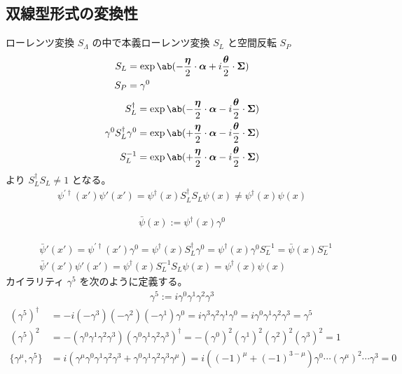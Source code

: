 \documentclass[uplatex,dvipdfmx,a4paper,11pt]{jlreq}
\theoremstyle{definition}
\numberwithin{equation}{section}
\begin{document}
\subsection{双線型形式の変換性}
ローレンツ変換 $S_\Lambda$ の中で本義ローレンツ変換 $S_L$ と空間反転 $S_P$
\begin{align}
  S_L & = \exp\ab(-\frac{\bm{\eta}}{2}\cdot\bm{\alpha} + i\frac{\bm{\theta}}{2}\cdot\bm{\Sigma}) \\
  S_P & = \gamma^0
\end{align}
\begin{align}
  S_L^\dagger                 & = \exp\ab(-\frac{\bm{\eta}}{2}\cdot\bm{\alpha} - i\frac{\bm{\theta}}{2}\cdot\bm{\Sigma}) \\
  \gamma^0S_L^\dagger\gamma^0 & = \exp\ab(+\frac{\bm{\eta}}{2}\cdot\bm{\alpha} - i\frac{\bm{\theta}}{2}\cdot\bm{\Sigma}) \\
  S_L^{-1}                    & = \exp\ab(+\frac{\bm{\eta}}{2}\cdot\bm{\alpha} - i\frac{\bm{\theta}}{2}\cdot\bm{\Sigma})
\end{align}
より $S_L^\dagger S_L \neq 1$ となる。
\begin{align}
  \psi^{\prime\dagger}(x')\psi'(x') = \psi^\dagger(x)S_L^\dagger S_L\psi(x) \neq \psi^\dagger(x)\psi(x)
\end{align}
\begin{definition}
  \begin{align}
    \bar{\psi}(x) := \psi^\dagger(x)\gamma^0
  \end{align}
\end{definition}
\begin{align}
   & \bar{\psi}'(x') = \psi^{\prime\dagger}(x')\gamma^0 = \psi^\dagger(x)S_L^\dagger\gamma^0 = \psi^\dagger(x)\gamma^0S_L^{-1} = \bar{\psi}(x)S_L^{-1} \\
   & \bar{\psi}'(x')\psi'(x') = \psi^\dagger(x)S_L^{-1} S_L\psi(x) = \psi^\dagger(x)\psi(x)
\end{align}
カイラリティ $\gamma^5$ を次のように定義する。
\begin{align}
  \gamma^5 := i\gamma^0\gamma^1\gamma^2\gamma^3
\end{align}
\begin{align}
  (\gamma^5)^\dagger                 & = -i(-\gamma^3)(-\gamma^2)(-\gamma^1)\gamma^0 = i\gamma^3\gamma^2\gamma^1\gamma^0 = i\gamma^0\gamma^1\gamma^2\gamma^3 = \gamma^5                                        \\
  (\gamma^5)^2                       & = -(\gamma^0\gamma^1\gamma^2\gamma^3)(\gamma^0\gamma^1\gamma^2\gamma^3)^\dagger = - (\gamma^0)^2(\gamma^1)^2(\gamma^2)^2(\gamma^3)^2 = 1                                \\
  \lbrace\gamma^\mu, \gamma^5\rbrace & = i(\gamma^\mu\gamma^0\gamma^1\gamma^2\gamma^3 + \gamma^0\gamma^1\gamma^2\gamma^3\gamma^\mu) = i((-1)^\mu + (-1)^{3-\mu})\gamma^0\cdots(\gamma^\mu)^2\cdots\gamma^3 = 0
\end{align}
\end{document}
